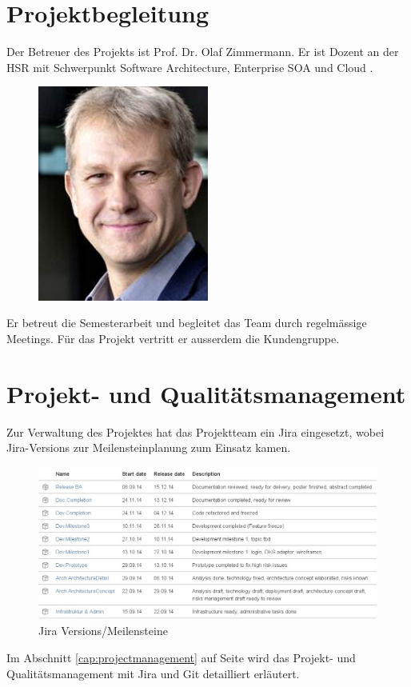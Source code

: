 	\section{Projektbegleitung}
	Der Betreuer des Projekts ist Prof. Dr. Olaf Zimmermann.
	Er ist Dozent an der HSR mit Schwerpunkt Software Architecture, Enterprise SOA und Cloud \cite{zimmermann_ifs_2014}.
	\begin{figure}[H]
		\begin{minipage}[b]{0.5\linewidth}
			\includegraphics[width=0.5\textwidth]{projectPlan/media/img/ozimmermann.jpg}
			\centering
			\caption{\teacher}
			\label{fig:olafzimmermann}
		\end{minipage}
	\end{figure}
	Er betreut die Semesterarbeit und begleitet das Team durch regelmässige Meetings.
	Für das Projekt vertritt er ausserdem die Kundengruppe.


	\section{Projekt- und Qualitätsmanagement}
		Zur Verwaltung des Projektes hat das Projektteam ein Jira eingesetzt,
		wobei Jira-Versions zur Meilensteinplanung zum Einsatz kamen.
		
		\begin{figure}[H]
			\includegraphics[width=\textwidth]{projectPlan/media/img/jiraVersions.jpg}
			\centering
			\caption{Jira Versions/Meilensteine}
			\label{fig:jiraVersions}
		\end{figure}
		
		Im Abschnitt \ref{cap:projectmanagement} auf Seite \pageref{cap:projectmanagement} wird das Projekt- und Qualitätsmanagement mit Jira und Git detailliert erläutert.
	
